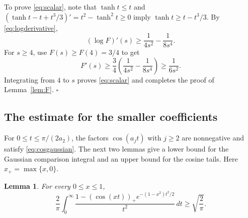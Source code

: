 \documentclass[a4paper,twoside,11pt,reqno]{amsart}
\newtheorem{lemma}{Lemma}
\theoremstyle{definition}
\theoremstyle{remark}
\newcommand{\1}{\mathbbm{1}}
\begin{document}
To prove \eqref{eq:scalar}, note that $\tanh t\le t$ and
$(\tanh t-t+t^3/3)'=t^2-\tanh^2t\ge0$ imply $\tanh t\ge t-t^3/3$. By \eqref{eq:logderivative},
\[
 (\log F)'(s)\ge\frac1{4s^2}-\frac1{8s^4}.
\]
For $s\ge4$, use $F(s)\ge F(4)=3/4$ to get
\[
 F'(s)\ge\frac34\left(\frac1{4s^2}-\frac1{8s^4}\right)
 \ge\frac1{6s^2}.
\]
Integrating from $4$ to $s$ proves \eqref{eq:scalar} and completes the proof of Lemma~\ref{lem:F}. \hfill$\square$

\subsection{The estimate for the smaller coefficients}\label{subsec:tail}
For $0\le t\le\pi/(2a_2)$, the factors $\cos(a_jt)$ with $j\ge2$ are nonnegative and satisfy \eqref{eq:cosgaussian}. The next two lemmas give a lower bound for the Gaussian comparison integral and an upper bound for the cosine tails. Here $x_+=\max\{x,0\}$.

\begin{lemma}\label{lem:positive}
For every $0\le x\le1$,
\begin{equation}\label{eq:positive}
 \frac2\pi\int_0^\infty
 \frac{1-(\cos(xt))_+e^{-(1-x^2)t^2/2}}{t^2}\,dt
 \ge\sqrt{\frac2\pi}.
\end{equation}
\end{lemma}
\end{document}

